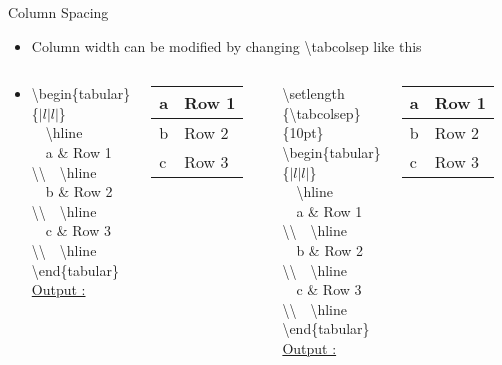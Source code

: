 \documentclass{beamer}
\begin{document}
\begin{frame}{Column Spacing}
\begin{itemize}
\pause \item Column width can be modified by changing \textbackslash tabcolsep like this
\pause\item[]\begin{columns}[c]
\column{1.5in}
\textbackslash begin\{tabular\}\{$|l|l|$\}\\
~~\textbackslash hline \\
~~a \& Row 1 \textbackslash\textbackslash ~~\textbackslash hline \\
~~b \& Row 2 \textbackslash\textbackslash ~~\textbackslash hline \\
~~c \& Row 3 \textbackslash\textbackslash ~~\textbackslash hline \\
\textbackslash end\{tabular\}\\
\vspace{0.3cm} \underline{Output :}\\
\begin{tabular}{|l|l|}
  \hline
  a & Row 1 \\ \hline
  b & Row 2 \\ \hline
  c & Row 3 \\ \hline
\end{tabular}
\column{2in}
\textbackslash setlength \{\textbackslash tabcolsep\}\{10pt\}\\
\textbackslash begin\{tabular\}\{$|l|l|$\}\\
~~\textbackslash hline \\
~~a \& Row 1 \textbackslash\textbackslash ~~\textbackslash hline \\
~~b \& Row 2 \textbackslash\textbackslash ~~\textbackslash hline \\
~~c \& Row 3 \textbackslash\textbackslash ~~\textbackslash hline \\
\textbackslash end\{tabular\}\\
\vspace{0.3cm} \underline{Output :}\\
\setlength{\tabcolsep}{10pt}
\begin{tabular}{|l|l|}
  \hline
  a & Row 1 \\ \hline
  b & Row 2 \\ \hline
  c & Row 3 \\ \hline
\end{tabular}
\end{columns}
\end{itemize}
\end{frame}
\end{document}
